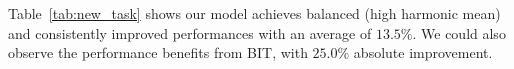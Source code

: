 Table~\ref{tab:new_task} shows our model achieves balanced (high harmonic mean) and consistently improved performances with an average of $13.5\%$. We could also observe the performance benefits from BIT, with $25.0\%$ absolute improvement.

